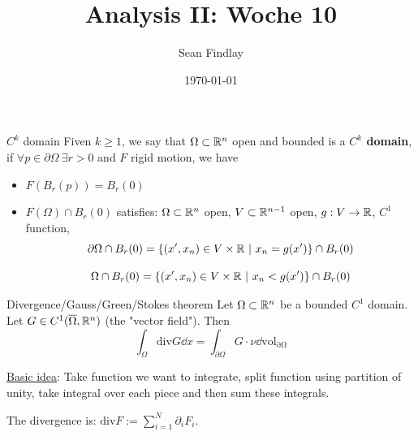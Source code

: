 \documentclass[12pt]{article}
\title{Analysis II: Woche 10}
\author{Sean Findlay}
\date{\today}
\begin{document}
\maketitle

\begin{definition}{$C^k$ domain}{}
    Fiven $k \geq 1$, we say that $\Omega \subset \mathbb{R}^n$ open and bounded is a \textbf{$C^k$ domain}, if $\forall p \in \partial \Omega\ \exists r > 0$ and $F$ rigid motion, we have 
    \begin{itemize}
        \item $F(B_r(p)) = B_r(0)$
        \item $F(\Omega) \cap B_r(0)$ satisfies: $\Omega \subset \mathbb{R}^n$ open, $V \subset \mathbb{R}^{n-1}$ open, $g: V \rightarrow \mathbb{R}$, $C^1$ function,
        $$
            \partial \Omega \cap B_r(0) = \left\{ (x', x_n) \in V \times \mathbb{R}  \ |\ x_n = g(x')\right\} \cap B_r(0)
        $$

        $$
            \Omega \cap B_r(0) = \left\{(x', x_n) \in V \times \mathbb{R}  \ |\ x_n < g(x') \right\} \cap B_r(0)
        $$
    \end{itemize}
\end{definition}

\begin{theorem}{Divergence/Gauss/Green/Stokes theorem}{}
    Let $\Omega \subset \mathbb{R}^n$ be a bounded $C^1$ domain. Let $G \in C^1(\overline\Omega, \mathbb{R}^n)$ (the "vector field"). Then
    $$
        \int_\Omega \mathrm{div} G \dd x = \int_{\partial \Omega} G \cdot \nu \dd \mathrm{vol_{\partial \Omega}}
    $$
\end{theorem}

\underline{Basic idea}: Take function we want to integrate, split function using partition of unity, take integral over each piece and then sum these integrals.

The divergence is: $\mathrm{div} F := \sum_{i = 1}^{N} \partial_i F_i$.
\end{document}
